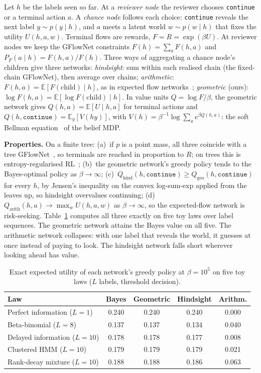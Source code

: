 \documentclass[sigconf,review,anonymous]{acmart}
\begin{document}
Let $h$ be the labels seen so far. At a \emph{reviewer node} the reviewer chooses \texttt{continue} or a terminal action $a$. A \emph{chance node} follows each choice: \texttt{continue} reveals the next label $y\sim p(y\mid h)$, and $a$ meets a latent world $w\sim p(w\mid h)$ that fixes the utility $U(h,a,w)$. Terminal flows are rewards, $F=R=\exp(\beta U)$. At reviewer nodes we keep the GFlowNet constraints $F(h)=\sum_a F(h,a)$ and $P_F(a\mid h)=F(h,a)/F(h)$. Three ways of aggregating a chance node's children give three networks:
\emph{hindsight}: sum within each realised chain (the fixed-chain GFlowNet), then average over chains;
\emph{arithmetic}: $F(h,a)=\mathbb{E}[F(\mathrm{child})\mid h]$, as in expected flow networks~\cite{jiralerspong2024expected};
\emph{geometric} (ours): $\log F(h,a)=\mathbb{E}[\log F(\mathrm{child})\mid h]$.
In value units $Q=\log F/\beta$, the geometric network gives $Q(h,a)=\mathbb{E}[U\mid h,a]$ for terminal actions and $Q(h,\texttt{continue})=\mathbb{E}_y[V(hy)]$, with $V(h)=\beta^{-1}\log\sum_a e^{\beta Q(h,a)}$: the soft Bellman equation~\cite{haarnoja2017energy} of the belief MDP.

\textbf{Properties.} On a finite tree:
(a)~if $p$ is a point mass, all three coincide with a tree GFlowNet~\cite{bengio2021flow}, so terminals are reached in proportion to $R$; on trees this is entropy-regularised RL~\cite{tiapkin2024entropy};
(b)~the geometric network's greedy policy tends to the Bayes-optimal policy as $\beta\to\infty$;
(c)~$Q_{\mathrm{hind}}(h,\texttt{continue})\ge Q_{\mathrm{geo}}(h,\texttt{continue})$ for every $h$, by Jensen's inequality on the convex log-sum-exp applied from the leaves up, so hindsight overvalues continuing;
(d)~$Q_{\mathrm{arith}}(h,a)\to\max_w U(h,a,w)$ as $\beta\to\infty$, so the expected-flow network is risk-seeking.
Table~\ref{tab:toys} computes all three exactly on five toy laws over label sequences. The geometric network attains the Bayes value on all five. The arithmetic network collapses: with one label that reveals the world, it guesses at once instead of paying to look. The hindsight network falls short wherever looking ahead has value.

\begin{table}[t]
\caption{Exact expected utility of each network's greedy policy at $\beta=10^5$ on five toy laws ($L$ labels, threshold decision).}
\label{tab:toys}
\small
\setlength{\tabcolsep}{3.5pt}
\begin{tabular}{lcccc}
\toprule
Law & Bayes & Geometric & Hindsight & Arithm. \\
\midrule
Perfect information ($L{=}1$) & 0.240 & 0.240 & 0.240 & 0.000 \\
Beta-binomial ($L{=}8$) & 0.137 & 0.137 & 0.134 & 0.040 \\
Delayed information ($L{=}10$) & 0.178 & 0.178 & 0.177 & 0.008 \\
Clustered HMM ($L{=}10$) & 0.179 & 0.179 & 0.179 & 0.021 \\
Rank-decay mixture ($L{=}10$) & 0.188 & 0.188 & 0.186 & 0.063 \\
\bottomrule
\end{tabular}
\end{table}
\end{document}
